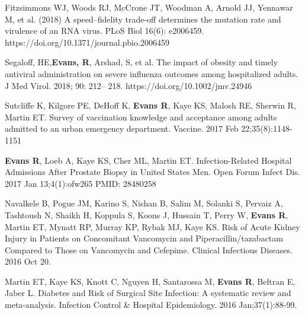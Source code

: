 \documentclass[10pt]{res} %
\begin{document}
\begin{resume}
\vspace{5pt}

Fitzsimmons WJ, Woods RJ, McCrone JT, Woodman A, Arnold JJ, Yennawar M, et al. (2018) A speed–fidelity trade-off determines the mutation rate and virulence of an RNA virus. PLoS Biol 16(6): e2006459. https://doi.org/10.1371/journal.pbio.2006459

\vspace{5pt}

Segaloff, HE,\textbf{Evans, R}, Arshad, S, et al. The impact of obesity and timely antiviral administration on severe influenza outcomes among hospitalized adults. J Med Virol. 2018; 90: 212– 218. https://doi.org/10.1002/jmv.24946

\vspace{5pt}

Sutcliffe K, Kilgore PE, DeHoff K, \textbf{Evans R}, Kaye KS, Malosh RE, Sherwin R, Martin ET. Survey of vaccination knowledge and acceptance among adults admitted to an urban emergency department. Vaccine. 2017 Feb 22;35(8):1148-1151

\vspace{5pt}

\textbf{Evans R}, Loeb A, Kaye KS, Cher ML, Martin ET. Infection-Related Hospital Admissions After Prostate Biopsy in United States Men. Open Forum Infect Dis. 2017 Jan 13;4(1):ofw265 PMID: 28480258

\vspace{5pt}

Navalkele B, Pogue JM, Karino S, Nishan B, Salim M, Solanki S, Pervaiz A,
Tashtoush N, Shaikh H, Koppula S, Koons J, Hussain T, Perry W, \textbf{Evans R}, Martin ET, Mynatt RP, Murray KP, Rybak MJ, Kaye KS. Risk of Acute Kidney Injury in Patients on Concomitant Vancomycin and Piperacillin/tazabactam Compared to Those on Vancomycin and Cefepime. Clinical Infectious Diseases. 2016 Oct 20.

\vspace{5pt}

Martin ET, Kaye KS, Knott C, Nguyen H, Santarossa M, \textbf{Evans R}, Beltran E, Jaber L. Diabetes and Risk of Surgical Site Infection: A systematic review and meta-analysis. Infection Control \& Hospital Epidemiology. 2016 Jan;37(1):88-99.



\end{resume}
\end{document}
